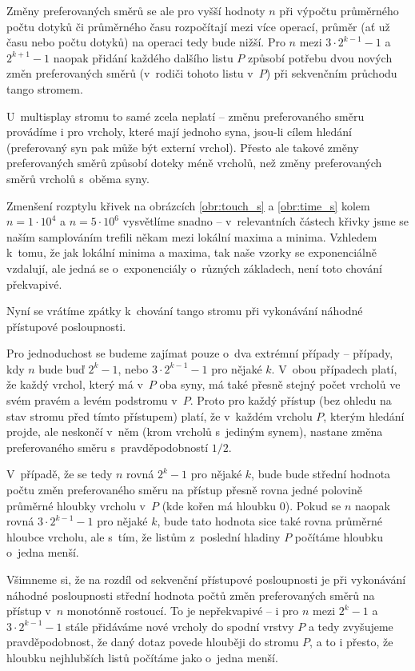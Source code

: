 Změny preferovaných směrů se ale pro vyšší hodnoty $n$ při výpočtu
průměrného počtu dotyků či průměrného času rozpočítají mezi více operací,
průměr (ať už času nebo počtu dotyků) na operaci tedy bude nižší. Pro $n$
 mezi $3\cdot 2^{k-1}-1$ a $2^{k+1}-1$ naopak přidání každého dalšího listu $P$ způsobí potřebu dvou nových změn preferovaných směrů (v~rodiči tohoto listu v~$P$) při sekvenčním průchodu tango stromem.

U~multisplay stromu to samé zcela neplatí -- změnu preferovaného směru
provádíme i pro vrcholy, které mají jednoho syna, jsou-li cílem hledání
(preferovaný syn pak může být externí vrchol). Přesto ale takové změny
preferovaných směrů způsobí doteky méně vrcholů, než změny preferovaných směrů vrcholů s~oběma syny.

Zmenšení rozptylu křivek na obrázcích \ref{obr:touch_s} a \ref{obr:time_s}
kolem $n=1\cdot 10^4$ a $n=5\cdot 10^6$ vysvětlíme snadno -- v~relevantních
částech křivky jsme se naším samplováním trefili někam mezi lokální maxima a
minima. Vzhledem k~tomu, že jak lokální minima a maxima, tak naše vzorky se
exponenciálně vzdalují, ale jedná se o~exponenciály o~různých základech, není
toto chování překvapivé.

Nyní se vrátíme zpátky k~chování tango stromu při vykonávání náhodné přístupové
posloupnosti.

Pro jednoduchost se budeme zajímat pouze o~dva extrémní případy --
případy, kdy $n$ bude buď $2^k-1$, nebo $3\cdot 2^{k-1} - 1$ pro nějaké $k$. V~obou
případech platí, že každý vrchol, který má v~$P$ oba syny, má také přesně
stejný počet vrcholů ve svém pravém a levém podstromu v~$P$. Proto pro každý
přístup (bez ohledu na stav stromu před tímto přístupem) platí, že v~každém
vrcholu $P$, kterým hledání projde, ale neskončí v~něm (krom vrcholů s~jediným
synem), nastane změna preferovaného směru s~pravděpodobností $1/2$.

V~případě, že se tedy $n$ rovná $2^k-1$ pro nějaké $k$, bude bude střední
hodnota počtu změn preferovaného směru na přístup přesně rovna jedné polovině
průměrné hloubky vrcholu v~$P$ (kde kořen má hloubku 0). Pokud se $n$ naopak rovná
$3\cdot2^{k-1}-1$ pro nějaké $k$, bude tato hodnota sice také rovna průměrné
hloubce vrcholu, ale s~tím, že listům z~poslední hladiny $P$ počítáme hloubku o~jedna menší.

Všimneme si, že na rozdíl od sekvenční přístupové posloupnosti je při vykonávání náhodné
posloupnosti střední hodnota počtů změn preferovaných směrů na přístup v~$n$
monotónně rostoucí. To je nepřekvapivé -- i pro $n$ mezi $2^k-1$ a $3\cdot
2^{k-1}-1$ stále přidáváme nové vrcholy do spodní vrstvy $P$ a tedy zvyšujeme
pravděpodobnost, že daný dotaz povede hlouběji do stromu $P$, a to i přesto, že
hloubku nejhlubších listů počítáme jako o~jedna menší.

